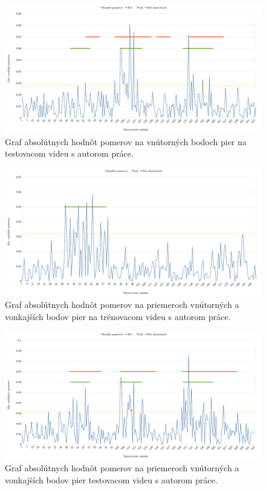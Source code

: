 \begin{figure}[H]
	\begin{center}
		\includegraphics[width=\textwidth]{pics/vnutriTestRiso.png}
		\caption{Graf absolútnych hodnôt pomerov na vnútorných bodoch pier na testovacom videu s autorom práce.}
		\label{pic-vnutriTestRiso}
	\end{center}
\end{figure}

\begin{figure}[H]
	\begin{center}
		\includegraphics[width=\textwidth]{pics/medziTreningRiso.png}
		\caption{Graf absolútnych hodnôt pomerov na priemeroch vnútorných a vonkajších bodov pier na trénovacom videu s autorom práce.}
		\label{pic-medziTreningRiso}
	\end{center}
\end{figure}

\begin{figure}[H]
	\begin{center}
		\includegraphics[width=\textwidth]{pics/medziTestRiso.png}
		\caption{Graf absolútnych hodnôt pomerov na priemeroch vnútorných a vonkajších bodov pier testovacom videu s autorom práce.}
		\label{pic-medziTestRiso}
	\end{center}
\end{figure}

